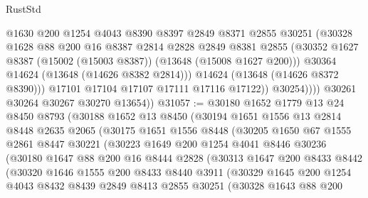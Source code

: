 \begin{lexlean}{RustStd}
\begin{coremodule}
                      @1630
                      @200
                      @1254
                      @4043
                      @8390
                      @8397
                      @2849
                      @8371
                      @2855
                      @30251
                      (@30328
                        @1628
                        @88
                        @200
                        @16
                        @8387
                        @2814
                        @2828
                        @2849
                        @8381
                        @2855
                        (@30352 @1627 @8387 (@15002 (@15003 @8387)) (@13648 (@15008 @1627 @200)))
                        @30364
                        @14624
                        (@13648 (@14626 @8382 @2814)))
                      @14624
                      (@13648 (@14626 @8372 @8390)))
                    @17101
                    @17104
                    @17107
                    @17111
                    @17116
                    @17122))
                @30254))))
        @30261
        @30264
        @30267
        @30270
        @13654))
@31057 := @30180
    @1652
    @1779
    @13
    @24
    @8450
    @8793
    (@30188
      @1652
      @13
      @8450
      (@30194
        @1651
        @1556
        @13
        @2814
        @8448
        @2635
        @2065
        (@30175
          @1651
          @1556
          @8448
          (@30205
            @1650
            @67
            @1555
            @2861
            @8447
            @30221
            (@30223
              @1649
              @200
              @1254
              @4041
              @8446
              @30236
              (@30180
                @1647
                @88
                @200
                @16
                @8444
                @2828
                (@30313
                  @1647
                  @200
                  @8433
                  @8442
                  (@30320
                    @1646
                    @1555
                    @200
                    @8433
                    @8440
                    @3911
                    (@30329
                      @1645
                      @200
                      @1254
                      @4043
                      @8432
                      @8439
                      @2849
                      @8413
                      @2855
                      @30251
                      (@30328
                        @1643
                        @88
                        @200

\end{coremodule}
\end{lexlean}
